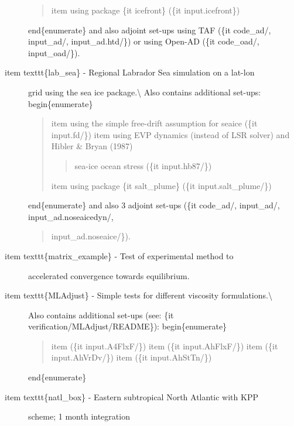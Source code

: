 \documentclass[letterpaper,10pt,english]{sphinxmanual}
\begin{document}
\begin{description}
\begin{quote}
\begin{description}
\end{description}

item using package \{it icefront\} (\{it input.icefront\})
\end{quote}

end\{enumerate\}
and also adjoint set-ups using TAF (\{it code\_ad/, input\_ad/, input\_ad.htd/\})
or using Open-AD (\{it code\_oad/, input\_oad/\}).

\item[{item texttt\{lab\_sea\} - Regional Labrador Sea simulation on a lat-lon}] \leavevmode
grid using the sea ice package.\textbackslash{}
Also contains additional set-ups:
begin\{enumerate\}
\begin{quote}

item using the simple \sphinxquotedblleft{}free-drift\sphinxquotedblright{} assumption for seaice (\{it input.fd/\})
item using EVP dynamics (instead of LSR solver) and Hibler \& Bryan (1987)
\begin{quote}

sea-ice ocean stress (\{it input.hb87/\})
\end{quote}

item using package \{it salt\_plume\} (\{it input.salt\_plume/\})
\end{quote}

end\{enumerate\}
and also 3 adjoint set-ups (\{it code\_ad/, input\_ad/, input\_ad.noseaicedyn/,
\begin{quote}

input\_ad.noseaice/\}).
\end{quote}

\item[{item texttt\{matrix\_example\} - Test of experimental method to}] \leavevmode
accelerated convergence towards equilibrium.

\item[{item texttt\{MLAdjust\} - Simple tests for different viscosity formulations.\textbackslash{}}] \leavevmode
Also contains additional set-ups (see: \{it verification/MLAdjust/README\}):
begin\{enumerate\}
\begin{quote}

item (\{it input.A4FlxF/\})
item (\{it input.AhFlxF/\})
item (\{it input.AhVrDv/\})
item (\{it input.AhStTn/\})
\end{quote}

end\{enumerate\}

\item[{item texttt\{natl\_box\} - Eastern subtropical North Atlantic with KPP}] \leavevmode
scheme; 1 month integration


\end{description}
\end{document}
